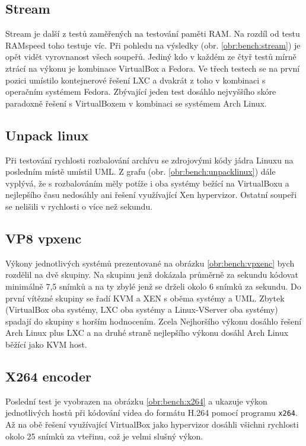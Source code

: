 \subsection{Stream}

Stream je další z testů zaměřených na testování paměti RAM. Na rozdíl od testu RAMspeed toho testuje víc. Při pohledu na výsledky (obr. \ref{obr:bench:stream}) je opět vidět vyrovnanost všech soupeřů. Jediný kdo v každém ze čtyř testů mírně ztrácí na výkonu je kombinace VirtualBox a Fedora. Ve třech testech se na první pozici umístilo kontejnerové řešení LXC a dvakrát z toho v kombinaci s operačním systémem Fedora. Zbývající jeden test dosáhlo nejvyššího skóre paradoxně řešení s VirtualBoxem v kombinaci se systémem Arch Linux. 
\subsection{Unpack linux}
Při testování rychlosti rozbalování archívu se zdrojovými kódy jádra Linuxu na posledním místě umístil UML. Z grafu (obr. \ref{obr:bench:unpacklinux}) dále vyplývá, že s rozbalováním měly potíže i oba systémy bežící na VirtualBoxu a nejlepšího času nedosáhly ani řešení využívající Xen hypervizor. Ostatní soupeři se nelišili v rychlosti o více než sekundu.
\subsection{VP8 vpxenc}
Výkony jednotlivých systémů prezentované na obrázku \ref{obr:bench:vpxenc} bych rozdělil na dvě skupiny. Na skupinu jenž dokázala průměrně za sekundu kódovat minimálně 7,5 snímků a na ty zbylé jenž se drželi okolo 6 snímků za sekundu. Do první vítězné skupiny se řadí KVM a XEN s oběma systémy a UML. Zbytek (VirtualBox oba systémy, LXC oba systémy a Linux-VServer oba systémy) spadají do skupiny s horším hodnocením. Zcela Nejhoršího výkonu dosáhlo řešení Arch Linux plus LXC a na druhé straně nejlepšího výkonu dosáhl Arch Linux běžící jako KVM host.
\subsection{X264 encoder}
Poslední test je vyobrazen na obrázku \ref{obr:bench:x264} a ukazuje výkon jednotlivých hostů při kódování videa do formátu H.264 pomocí programu \texttt{x264}. Až na obě řešení využívající VirtualBox jako hypervizor dosáhli všichni rychlosti okolo 25 snímků za vteřinu, což je velmi slušný výkon.

